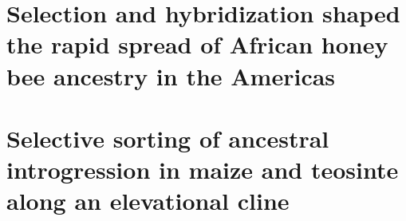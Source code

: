    \pagestyle{maintext}
   
   
   \chapter{Selection and hybridization shaped the rapid spread of African honey bee ancestry in the Americas}
   

   \chapter{Selective sorting of ancestral introgression in maize and teosinte along an elevational cline}
   

       
   \backmatter
   
   
   
